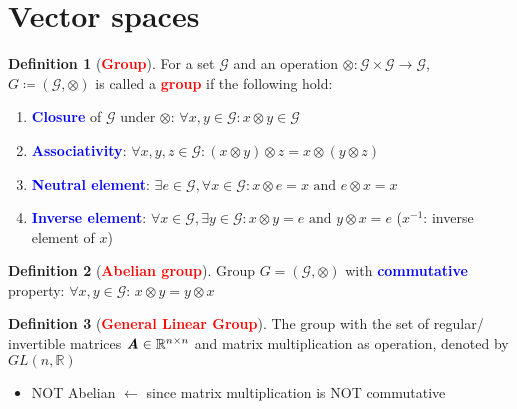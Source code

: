 \documentclass[12pt]{article}
\theoremstyle{definition}
\newtheorem{definition}{Definition}[section]
\newcommand{\keyword}[1]{\textbf{\textcolor{red}{#1}}}
\newcommand{\subkeyword}[1]{\textbf{\textcolor{blue}{#1}}}
\newcommand{\mat}[1]{\textit{\textbf{#1}}}
\newcommand{\rspace}[2]{\mathbb{R}^{#1 \times #2}}
\begin{document}
    \section{Vector spaces}
        \begin{definition}[\keyword{Group}]
            For a set $\mathcal{G}$ and an operation 
            $\otimes: \mathcal{G}\times\mathcal{G}\rightarrow\mathcal{G}$,
            $G\coloneqq(\mathcal{G}, \otimes)$ is called a \keyword{group} if 
            the following hold:
            \begin{enumerate}
                \item \subkeyword{Closure} of $\mathcal{G}$ under $\otimes$:
                    $\forall x, y\in\mathcal{G}: x\otimes y\in\mathcal{G}$
                \item \subkeyword{Associativity}: $\forall x,y,z\in\mathcal{G}: (x\otimes y)\otimes z=x\otimes(y\otimes z)$
                \item \subkeyword{Neutral element}: $\exists e\in\mathcal{G}, \forall x\in\mathcal{G}: x\otimes e=x \text{ and } e\otimes x=x$
                \item \subkeyword{Inverse element}: $\forall x\in\mathcal{G}, \exists y\in\mathcal{G}: x\otimes y=e \text{ and } y\otimes x=e$ ($x^{-1}$: inverse element of $x$)
            \end{enumerate}
        \end{definition}
        \begin{definition}[\keyword{Abelian group}]
            Group $G=(\mathcal{G},\otimes)$ with \subkeyword{commutative} property: 
            $\forall x,y\in\mathcal{G}$: $x\otimes y=y\otimes x$ 
        \end{definition}
        \begin{definition}[\keyword{General Linear Group}]
            The group with the set of regular/ invertible matrices 
            $\mat{A}\in\rspace{n}{n}$ and matrix multiplication as operation, 
            denoted by $GL(n, \mathbb{R})$
            \begin{itemize}
                \item NOT Abelian $\leftarrow$ since matrix multiplication is 
                    NOT commutative
            \end{itemize}
        \end{definition}
\end{document}
